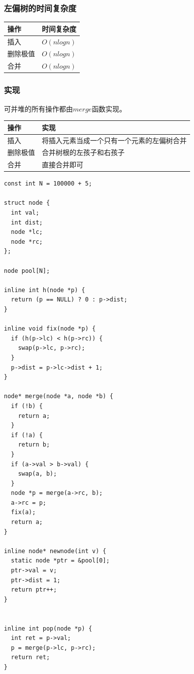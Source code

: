 \documentclass[11pt]{article}
\begin{document}
\subsubsection{左偏树的时间复杂度}
\label{sec-6-3-1}

\begin{center}
\begin{tabular}{ll}
操作 & 时间复杂度\\
\hline
插入 & \(O(nlogn)\)\\
删除极值 & \(O(nlogn)\)\\
合并 & \(O(nlogn)\)\\
\end{tabular}
\end{center}

\subsubsection{实现}
\label{sec-6-3-2}

可并堆的所有操作都由\(merge\)函数实现。

\begin{center}
\begin{tabular}{ll}
操作 & 实现\\
\hline
插入 & 将插入元素当成一个只有一个元素的左偏树合并\\
删除极值 & 合并树根的左孩子和右孩子\\
合并 & 直接合并即可\\
\end{tabular}
\end{center}


\begin{verbatim}
const int N = 100000 + 5;

struct node {
  int val;
  int dist;
  node *lc;
  node *rc;
};

node pool[N];

inline int h(node *p) {
  return (p == NULL) ? 0 : p->dist;
}

inline void fix(node *p) {
  if (h(p->lc) < h(p->rc)) {
    swap(p->lc, p->rc);
  }
  p->dist = p->lc->dist + 1;
}

node* merge(node *a, node *b) {
  if (!b) {
    return a;
  }
  if (!a) {
    return b;
  }
  if (a->val > b->val) {
    swap(a, b);
  }
  node *p = merge(a->rc, b);
  a->rc = p;
  fix(a);
  return a;
}

inline node* newnode(int v) {
  static node *ptr = &pool[0];
  ptr->val = v;
  ptr->dist = 1;
  return ptr++;
}


inline int pop(node *p) {
  int ret = p->val;
  p = merge(p->lc, p->rc);
  return ret;
}
\end{verbatim}
\end{document}
